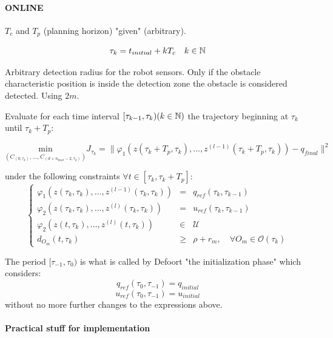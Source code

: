 


\paragraph{ONLINE}

$T_c$ and $T_p$ (planning horizon) "given" (arbitrary).

\[
	\tau_{k} = t_{initial}+kT_c\quad k \in \mathbb{N}
\]

Arbitrary detection radius for the robot sensors. Only if the obstacle characteristic position  is inside the detection zone the obstacle is considered detected. Using $2m$.

Evaluate for each time interval $[\tau_{k-1},\tau_k) (k \in \mathbb{N})$ the trajectory beginning at $\tau_k$ until $\tau_k+T_p$:

\begin{equation}
	\underset{(C_{(0,\tau_k)},\dotsc,C_{(d+n_{knot}-2,\tau_k)})}{\mathrm{min}} J_{\tau_k} = \|\varphi_1(z(\tau_k+T_p,\tau_k),\dotsc,z^{(l-1)}(\tau_k+T_p,\tau_k))-q_{final}\|^2
\end{equation}

under the following constraints $\forall t \in [\tau_k, \tau_k+T_p]$:
\begin{equation}%
\left\lbrace\begin{array}{lcl}
	\varphi_1(z(\tau_{k},\tau_{k}),\dotsc,z^{(l-1)}(\tau_k,\tau_k)) & = & q_{ref}(\tau_k,\tau_{k-1})\\
    \varphi_2(z(\tau_{k},\tau_{k}),\dotsc,z^{(l)}(\tau_k,\tau_k)) & = & u_{ref}(\tau_k,\tau_{k-1})\\
    \varphi_2(z(t,\tau_k),\dotsc,z^{(l)}(t,\tau_k)) &\in& \mathcal{U}\\
    d_{O_m}(t,\tau_k) &\geq& \rho + r_m,\quad \forall O_m \in \mathcal{O}(\tau_k)
\end{array}\right.
\end{equation}

The period $[\tau_{-1},\tau_0)$ is what is called by Defoort "the initialization phase" which considers: $$q_{ref}(\tau_0,\tau_{-1}) = q_{initial}$$ $$u_{ref}(\tau_0,\tau_{-1}) = u_{initial}$$ without no more further changes to the expressions above.


\paragraph{Practical stuff for implementation}

